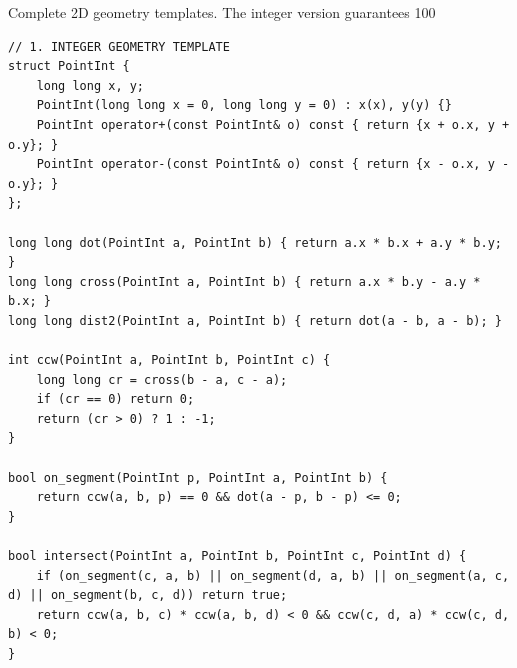 
Complete 2D geometry templates. The integer version guarantees 100%

\begin{lstlisting}
// 1. INTEGER GEOMETRY TEMPLATE
struct PointInt {
    long long x, y;
    PointInt(long long x = 0, long long y = 0) : x(x), y(y) {}
    PointInt operator+(const PointInt& o) const { return {x + o.x, y + o.y}; }
    PointInt operator-(const PointInt& o) const { return {x - o.x, y - o.y}; }
};

long long dot(PointInt a, PointInt b) { return a.x * b.x + a.y * b.y; }
long long cross(PointInt a, PointInt b) { return a.x * b.y - a.y * b.x; }
long long dist2(PointInt a, PointInt b) { return dot(a - b, a - b); }

int ccw(PointInt a, PointInt b, PointInt c) {
    long long cr = cross(b - a, c - a);
    if (cr == 0) return 0;
    return (cr > 0) ? 1 : -1;
}

bool on_segment(PointInt p, PointInt a, PointInt b) {
    return ccw(a, b, p) == 0 && dot(a - p, b - p) <= 0;
}

bool intersect(PointInt a, PointInt b, PointInt c, PointInt d) {
    if (on_segment(c, a, b) || on_segment(d, a, b) || on_segment(a, c, d) || on_segment(b, c, d)) return true;
    return ccw(a, b, c) * ccw(a, b, d) < 0 && ccw(c, d, a) * ccw(c, d, b) < 0;
}
\end{lstlisting}

